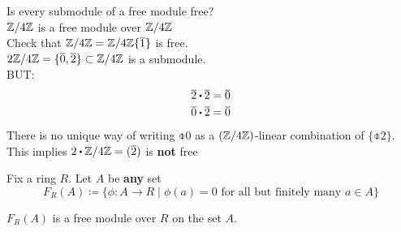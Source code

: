 \documentclass[../Main.tex]{subfiles}
\begin{document}
\begin{example}
	Is every submodule of a free module free?\\
	$\mathbb{Z}/4\mathbb{Z}$ is a free module over $\mathbb{Z}/4\mathbb{Z}$\\
	\Exr Check that $\mathbb{Z}/4\mathbb{Z} = \mathbb{Z}/4\mathbb{Z}\{\overline{1}\}$ is free.\\
	$2\mathbb{Z}/4\mathbb{Z}=\{\overline{0},\overline{2}\} \subset \mathbb{Z}/4\mathbb{Z}$ is a submodule.\\
	BUT:
	\begin{align*}
	\obar{2}\rdot \obar{2}=\obar{0}\\
	\obar{0}\rdot \obar{2}=\obar{0}
	\end{align*}
	There is no unique way of writing $\obar{0}$ as a $(\mathbb{Z}/4\mathbb{Z})$-linear combination of $\{\obar{2}\}$. This implies $2\rdot \modZ{4}=(\obar{2})$ is \textbf{not} free
\end{example}
\begin{example}
	Fix a ring $R$. Let $A$ be \textbf{any} set
	\[F_R(A) \coloneqq \{\phi\colon A\to R\mid \phi(a)=0 \text{ for all but finitely many }a\in A\}\]
\end{example}
\begin{prop}
	$F_R(A)$ is a free module over $R$ on the set $A$.
\end{prop}
\end{document}
